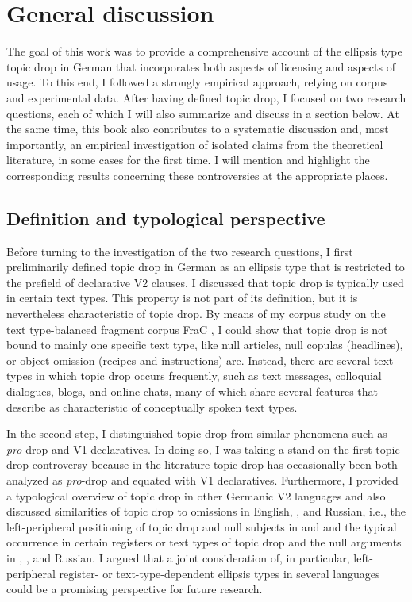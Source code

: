 \chapter{General discussion}\label{ch:discussion}
The goal of this work was to provide a comprehensive account of the ellipsis type topic drop in German that incorporates both aspects of licensing and aspects of usage.
To this end, I followed a strongly empirical approach, relying on corpus and experimental data.
After having defined topic drop, I focused on two research questions, each of which I will also summarize and discuss in a section below.
At the same time, this book also contributes to a systematic discussion and, most importantly, an empirical investigation of isolated claims from the theoretical literature, in some cases for the first time.
I will mention and highlight the corresponding results concerning these controversies at the appropriate places.

\section{Definition and typological perspective}
Before turning to the investigation of the two research questions, I first preliminarily defined topic drop in German as an ellipsis type that is restricted to the prefield of declarative V2 clauses. 
I discussed that topic drop is typically used in certain text types. 
This property is not part of its definition, but it is nevertheless characteristic of topic drop.
By means of my corpus  study on the text type-balanced  fragment corpus FraC \citep{horch.reich2017}, I could show that topic drop is not bound to mainly one specific text type, like null articles,  null copulas (headlines),  or object omission  (recipes and instructions) are. 
Instead, there are several text types in which topic drop occurs frequently, such as text messages, colloquial dialogues, blogs, and online chats, many of which share several features that \citet{koch.oesterreicher1985} describe as characteristic of conceptually spoken text types. 

In the second step, I distinguished topic drop from similar phenomena such as \textit{pro}-drop  and V1 declaratives.
In doing so, I was taking a stand on the first topic drop controversy because in the literature topic drop has occasionally been both analyzed as \textit{pro}-drop and equated with V1 declaratives. 
Furthermore, I provided a typological overview of topic drop in other Germanic V2 languages and also discussed similarities of topic drop to omissions in English, , and Russian,  i.e., the left-peripheral positioning of topic drop and null subjects  in  and  and the typical occurrence in certain registers or text types  of topic drop and the null arguments  in , , and Russian. 
I argued that a joint consideration of, in particular, left-peripheral register- or text-type-dependent ellipsis types in several languages could be a promising perspective for future research.

